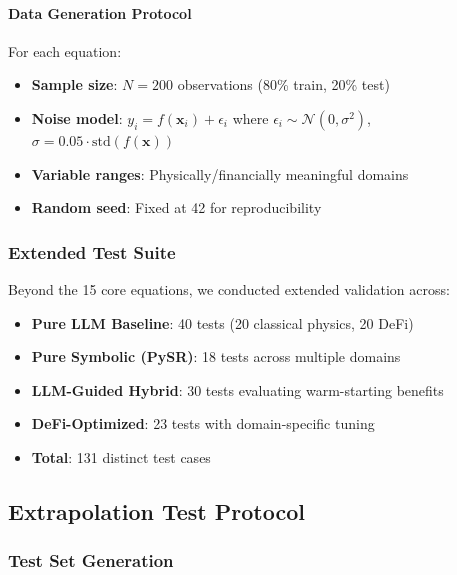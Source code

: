 \documentclass[twoside,11pt]{article}
\begin{document}
\paragraph{Data Generation Protocol}

For each equation:
\begin{itemize}
    \item \textbf{Sample size}: $N = 200$ observations (80\% train, 20\% test)
    \item \textbf{Noise model}: $y_i = f(\mathbf{x}_i) + \epsilon_i$ where $\epsilon_i \sim \mathcal{N}(0, \sigma^2)$, $\sigma = 0.05 \cdot \text{std}(f(\mathbf{x}))$
    \item \textbf{Variable ranges}: Physically/financially meaningful domains
    \item \textbf{Random seed}: Fixed at 42 for reproducibility
\end{itemize}

\subsubsection{Extended Test Suite}

Beyond the 15 core equations, we conducted extended validation across:
\begin{itemize}
\item \textbf{Pure LLM Baseline}: 40 tests (20 classical physics, 20 DeFi)\citep{kambhampati2024llms}
\item \textbf{Pure Symbolic (PySR)}: 18 tests across multiple domains
\item \textbf{LLM-Guided Hybrid}: 30 tests evaluating warm-starting benefits\citep{kambhampati2024llms}
\item \textbf{DeFi-Optimized}: 23 tests with domain-specific tuning
\item \textbf{Total}: 131 distinct test cases
\end{itemize}


\subsection{Extrapolation Test Protocol}
\label{sec:extrapolation_metric}

\subsubsection{Test Set Generation}
\end{document}
